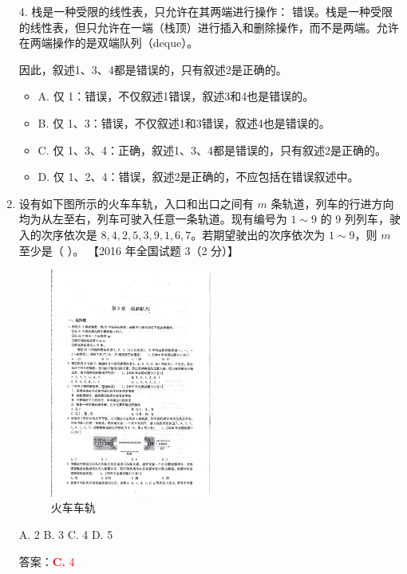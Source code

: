 \documentclass[lang=cn,newtx,10pt,scheme=chinese]{../../../elegantbook}
\begin{document}
\begin{enumerate}
    4. 栈是一种受限的线性表，只允许在其两端进行操作：
       错误。栈是一种受限的线性表，但只允许在一端（栈顶）进行插入和删除操作，而不是两端。允许在两端操作的是双端队列（deque）。

    因此，叙述1、3、4都是错误的，只有叙述2是正确的。

    \begin{itemize}
        \item A. 仅 1：错误，不仅叙述1错误，叙述3和4也是错误的。
        \item B. 仅 1、3：错误，不仅叙述1和3错误，叙述4也是错误的。
        \item C. 仅 1、3、4：正确，叙述1、3、4都是错误的，只有叙述2是正确的。
        \item D. 仅 1、2、4：错误，叙述2是正确的，不应包括在错误叙述中。
    \end{itemize}

    \item 设有如下图所示的火车车轨，入口和出口之间有 $m$ 条轨道，列车的行进方向均为从左至右，列车可驶入任意一条轨道。现有编号为 $1 \sim 9$ 的 9 列列车，驶入的次序依次是 $8, 4, 2, 5, 3, 9, 1, 6, 7$。若期望驶出的次序依次为 $1 \sim 9$，则 $m$ 至少是（ ）。  
    【2016 年全国试题 3（2 分）】  

    \begin{figure}[h!]
        \centering
        \includegraphics[width=0.5\textwidth]{../../figure/exercisePicPDF/chapter3/3-4.pdf}
        \caption{火车车轨}
        \label{fig:linear_list_2}
    \end{figure}
    A. 2 \quad B. 3 \quad C. 4 \quad D. 5  

    答案：\textcolor{red}{\textbf{C.} 4}


\end{enumerate}
\end{document}
